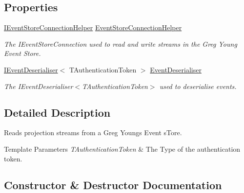 \subsection*{Properties}
\begin{DoxyCompactItemize}
\item 
\hyperlink{interfaceCqrs_1_1EventStore_1_1IEventStoreConnectionHelper}{I\+Event\+Store\+Connection\+Helper} \hyperlink{classCqrs_1_1EventStore_1_1ProjectionReader_ab169b1404cc40751c3a71c772ed0eaa4_ab169b1404cc40751c3a71c772ed0eaa4}{Event\+Store\+Connection\+Helper}
\begin{DoxyCompactList}\small\item\em The I\+Event\+Store\+Connection used to read and write streams in the Greg Young Event Store. \end{DoxyCompactList}\item 
\hyperlink{interfaceCqrs_1_1EventStore_1_1IEventDeserialiser}{I\+Event\+Deserialiser}$<$ T\+Authentication\+Token $>$ \hyperlink{classCqrs_1_1EventStore_1_1ProjectionReader_a2c7ada08a9525c161eb7e42e2dbf55e0_a2c7ada08a9525c161eb7e42e2dbf55e0}{Event\+Deserialiser}
\begin{DoxyCompactList}\small\item\em The I\+Event\+Deserialiser$<$\+T\+Authentication\+Token$>$ used to deserialise events. \end{DoxyCompactList}\end{DoxyCompactItemize}


\subsection{Detailed Description}
Reads projection streams from a Greg Young\textquotesingle{}s Event s\+Tore. 


\begin{DoxyTemplParams}{Template Parameters}
{\em T\+Authentication\+Token} & The Type of the authentication token.\\
\hline
\end{DoxyTemplParams}


\subsection{Constructor \& Destructor Documentation}
\mbox{\label{classCqrs_1_1EventStore_1_1ProjectionReader_a87d5f996f75577bb6ae18704c9a590a2_a87d5f996f75577bb6ae18704c9a590a2}} 

